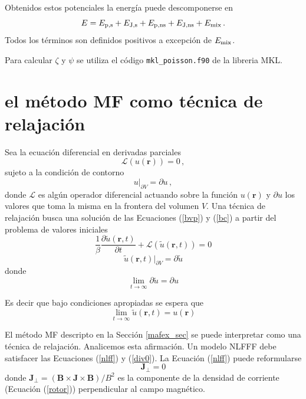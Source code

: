 \documentclass[a4paper,10pt]{article}
\def\bB{{\boldsymbol{B}}}
\def\br{{\boldsymbol{r}}}
\def\bJ{{\boldsymbol{J}}}
\def\dt#1{\frac{\partial #1}{\partial t}}
\def\eq#1{Ecuación (\ref{#1})}
\def\eqs#1#2{Ecuaciones (\ref{#1}) y (\ref{#2})}
\def\jperp{\bJ_\perp}
\begin{document}
Obtenidos estos potenciales la energía puede descomponerse en 
\begin{equation}
 E = E_{\rm p,s} +  E_{\rm J,s} +  E_{\rm p,ns} +  E_{\rm J,ns} + E_{\rm mix} \,.
\end{equation}
Todos los términos son definidos positivos a excepción de $E_{\rm mix}$.

Para calcular $\zeta$ y $\psi$ se utiliza el código {\tt mkl\_poisson.f90} de la libreria MKL. 

\section{el método MF como técnica de relajación}

Sea la ecuación diferencial en derivadas parciales
\begin{equation}
 \mathcal{L} \left(  u(\br) \right) = 0 \,,
 \label{bvp}
\end{equation}
sujeto a la condición de contorno
\begin{equation}
 u \rvert_{\partial V} = \partial u \,,
\label{bc}
 \end{equation}
donde $\mathcal{L}$ es algún operador diferencial actuando sobre la función $u(\br)$ y $\partial u$ los valores que toma la misma en la frontera del volumen $V$. Una técnica de relajación busca una solución de las \eqs{bvp}{bc} a partir del problema de valores iniciales
\begin{equation}
 \frac{1}{\beta} \dt{\tilde{u}(\br,t)} +  \mathcal{L} \left(  \tilde{u}(\br,t) \right) = 0
\end{equation}
\begin{equation}
 \tilde{u}(\br,t)\rvert_{\partial V} = \partial \tilde{u}
\end{equation}
donde
\begin{equation}
\lim\limits_{t \to \infty}\partial \tilde{u}= \partial {u}
\end{equation}

Es decir que bajo condiciones apropiadas se espera que 
\begin{equation}
\lim\limits_{t \to \infty}\tilde{u}(\br,t)= u(\br)
\end{equation}

El método MF descripto en la Sección \ref{mafex_sec} se puede interpretar como una técnica de relajación. Analicemos esta afirmación. Un modelo NLFFF debe satisfacer las \eqs{nlff}{div0}. La \eq{nlff} puede reformularse
\begin{equation}
 \bJ_\perp = 0 \label{jperp0}
\end{equation}
donde $\jperp=(\bB \times \bJ \times \bB)/B^2$ es la componente de la densidad de corriente (\eq{rotor}) perpendicular al campo magnético. 
\end{document}

